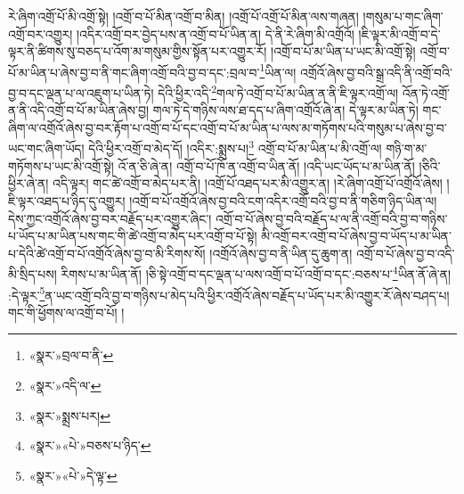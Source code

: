 རེ་ཞིག་འགྲོ་པོ་མི་འགྲོ་སྟེ། །འགྲོ་བ་པོ་མིན་འགྲོ་བ་མིན། །འགྲོ་པོ་འགྲོ་པོ་མིན་ལས་གཞན། །གསུམ་པ་གང་ཞིག་འགྲོ་བར་འགྱུར། །འདིར་འགྲོ་བར་བྱེད་པས་ན་འགྲོ་བ་པོ་ཡིན་ན། དེ་ནི་རེ་ཞིག་མི་འགྲོའོ། །ཇི་ལྟར་མི་འགྲོ་བ་དེ་ལྟར་ནི་ཚིགས་སུ་བཅད་པ་འོག་མ་གསུམ་གྱིས་སྟོན་པར་འགྱུར་རོ། །འགྲོ་བ་པོ་མ་ཡིན་པ་ཡང་མི་འགྲོ་སྟེ། འགྲོ་བ་པོ་མ་ཡིན་པ་ཞེས་བྱ་བ་ནི་གང་ཞིག་འགྲོ་བའི་བྱ་བ་དང་:བྲལ་བ་\footnote{«སྣར་»བྲལ་བ་ནི་}ཡིན་ལ། འགྲོའོ་ཞེས་བྱ་བའི་སྒྲ་འདི་ནི་འགྲོ་བའི་བྱ་བ་དང་ལྡན་པ་ལ་འཇུག་པ་ཡིན་ཏེ། དེའི་ཕྱིར་འདི་\footnote{«སྣར་»འདི་ལ་}གལ་ཏེ་འགྲོ་བ་པོ་མ་ཡིན་ན་ནི་ཇི་ལྟར་འགྲོ་ལ། འོན་ཏེ་འགྲོ་ན་ནི་འདི་འགྲོ་བ་པོ་མ་ཡིན་ཞེས་བྱ། གལ་ཏེ་དེ་གཉིས་ལས་ཐ་དད་པ་ཞིག་འགྲོའོ་ཞེ་ན། དེ་ལྟར་མ་ཡིན་ཏེ། གང་ཞིག་ལ་འགྲོའོ་ཞེས་བྱ་བར་རྟོག་པ་འགྲོ་བ་པོ་དང་འགྲོ་བ་པོ་མ་ཡིན་པ་ལས་མ་གཏོགས་པའི་གསུམ་པ་ཞེས་བྱ་བ་ཡང་གང་ཞིག་ཡོད། དེའི་ཕྱིར་འགྲོ་བ་མེད་དོ། །འདིར་:སྨྲས་པ།\footnote{«སྣར་»སྨྲས་པར།} འགྲོ་བ་པོ་མ་ཡིན་པ་མི་འགྲོ་ལ། གཉི་ག་མ་གཏོགས་པ་ཡང་མི་འགྲོ་སྟེ། འོ་ན་ཅི་ཞེ་ན། འགྲོ་བ་པོ་ཁོ་ན་འགྲོ་བ་ཡིན་ནོ། །འདི་ཡང་ཡོད་པ་མ་ཡིན་ནོ། །ཅིའི་ཕྱིར་ཞེ་ན། འདི་ལྟར། གང་ཚེ་འགྲོ་བ་མེད་པར་ནི། །འགྲོ་པོ་འཐད་པར་མི་འགྱུར་ན། །རེ་ཞིག་འགྲོ་པོ་འགྲོའོ་ཞེས། །ཇི་ལྟར་འཐད་པ་ཉིད་དུ་འགྱུར། །འགྲོ་བ་པོ་འགྲོའོ་ཞེས་བྱ་བའི་ངག་འདིར་འགྲོ་བའི་བྱ་བ་ནི་གཅིག་ཉིད་ཡིན་ལ། དེས་ཀྱང་འགྲོའོ་ཞེས་བྱ་བར་བརྗོད་པར་འགྱུར་ཞིང་། འགྲོ་བ་པོ་ཞེས་བྱ་བའི་བརྗོད་པ་ལ་ནི་འགྲོ་བའི་བྱ་བ་གཉིས་པ་ཡོད་པ་མ་ཡིན་པས་གང་གི་ཚེ་འགྲོ་བ་མེད་པར་འགྲོ་བ་པོ་སྟེ། མི་འགྲོ་བར་འགྲོ་བ་པོ་ཞེས་བྱ་བ་ཡོད་པ་མ་ཡིན་པ་དེའི་ཚེ་འགྲོ་བ་པོ་འགྲོའོ་ཞེས་བྱ་བ་མི་རིགས་སོ། །འགྲོའོ་ཞེས་བྱ་བ་ནི་ཡིན་དུ་ཆུག་ན། འགྲོ་བ་པོ་ཞེས་བྱ་བ་འདི་མི་སྲིད་པས། རིགས་པ་མ་ཡིན་ནོ། །ཅི་སྟེ་འགྲོ་བ་དང་ལྡན་པ་ལས་འགྲོ་བ་པོ་འགྲོ་བ་དང་:བཅས་པ་\footnote{«སྣར་»«པེ་»བཅས་པ་ཉིད་}ཡིན་ནོ་ཞེ་ན། :དེ་ལྟར་\footnote{«སྣར་»«པེ་»དེ་ལྟ་}ན་ཡང་འགྲོ་བའི་བྱ་བ་གཉིས་པ་མེད་པའི་ཕྱིར་འགྲོའོ་ཞེས་བརྗོད་པ་ཡོད་པར་མི་འགྱུར་རོ་ཞེས་བཤད་པ། གང་གི་ཕྱོགས་ལ་འགྲོ་བ་པོ། །
